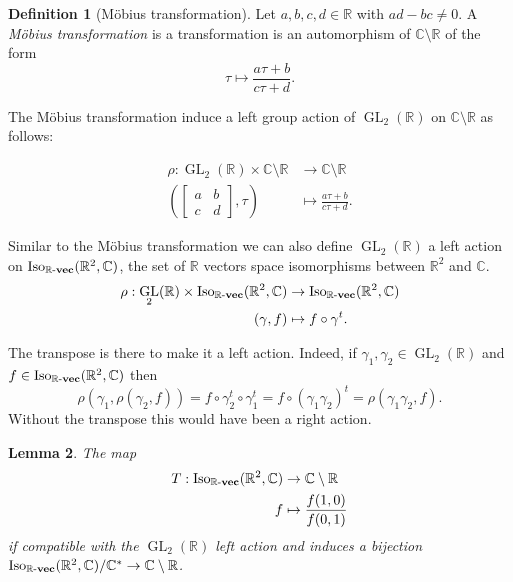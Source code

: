 \documentclass[a4paper,12pt,reqno]{amsart}
\newcommand{\field}[1]{\mathbb{#1}}  %
\newcommand{\R}{\field{R}} %
\newcommand{\C}{\field{C}} %
\newcommand{\IsoKVec}[1]{\mathrm{Iso}_{#1 {\bf\text{-}vec}}}
\newcommand{\transpose}{t}
\DeclareMathOperator{\GL}{GL}
\newtheorem{lemma}{Lemma}
\theoremstyle{definition}
\newtheorem{definition}[lemma]{Definition}
\numberwithin{lemma}{section}
\numberwithin{equation}{section}
\numberwithin{figure}{section}
\begin{document}
\begin{definition}[M\"obius transformation]\label{def:mobius-transformation}
Let $a,b,c,d \in \R$ with $ad-bc \neq 0$. A \textit{M\"obius transformation} is a transformation is an automorphism of $\C\setminus \R$ of the form
$$ \tau \mapsto \frac {a\tau+b} {c\tau +d}.$$

The M\"obius transformation induce a left group action of $\GL_2(\R)$ on $\C\setminus \R$ as follows:

\begin{align}
\rho :  \GL_2(\R) \times \C\setminus \R &\to \C\setminus \R \\
\left(\begin{bmatrix}
a & b \\ 
c & d
\end{bmatrix}  ,\tau\right) &\mapsto  \frac {a\tau+b} {c\tau +d}.
\end{align}
\end{definition}


Similar to the M\"obius transformation we can also define  $\GL_2(\R)$ a left action on $\IsoKVec{\R}(\R^2,\C)$, the set of $\R$ vectors space isomorphisms between $\R^2$ and $\C$.
\begin{align}
\rho :  \GL_2(\R) \times \IsoKVec{\R}(\R^2,\C) &\to \IsoKVec{\R}(\R^2,\C) \\
\left( \gamma  , f \right) &\mapsto  f \circ \gamma^\transpose.
\end{align}

The transpose is there to make it a left action.  Indeed, if $\gamma_1,\gamma_2 \in \GL_2(\R)$ and $f \in  \IsoKVec{\R}(\R^2,\C)$ then $$\rho(\gamma_1,\rho(\gamma_2,f))=f \circ \gamma_2^\transpose \circ \gamma_1^\transpose = f \circ (\gamma_1 \gamma_2)^\transpose = \rho(\gamma_1\gamma_2,f).$$ Without the transpose this would have been a right action. 

\begin{lemma}
The map 
\begin{align}T  :\IsoKVec{\R}(\R^2,\C) &\to \C \setminus \R\\
                             f &\mapsto \frac {f(1,0)}{f(0,1)}
\end{align}
if compatible with the $\GL_2(\R)$ left action and induces a bijection $\IsoKVec{\R}(\R^2,\C)/\C^* \to \C \setminus \R$.
\end{lemma}
\end{document}
